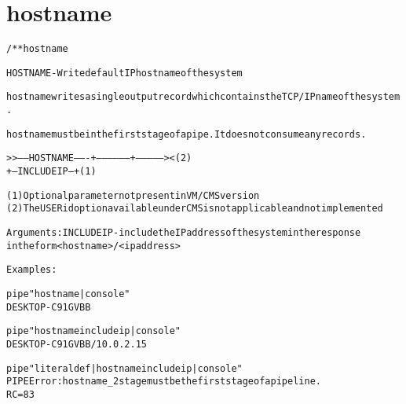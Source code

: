 \section{hostname}
\begin{shaded}
\begin{alltt}
/** hostname


     HOSTNAME - Write default IP host name of the system
   
     hostname writes a single output record which contains the TCP/IP name of the system. 
      
     hostname must be in the first stage of a pipe.  It does not consume any records.  
                                              
     >>-----HOSTNAME -------+-----------------+--------------><   (2)
                            +--- INCLUDEIP ---+ (1)
  
     (1) Optional parameter not present in VM/CMS version
     (2) The USERid option available under CMS is not applicable and not implemented
   
     Arguments:  INCLUDEIP - include the IP address of the system in the response
                             in the form <hostname>/<ip address>
   
     Examples:
   
     pipe "hostname | console"
     DESKTOP-C91GVBB
   
     pipe "hostname includeip | console"
     DESKTOP-C91GVBB/10.0.2.15
   
     pipe "literal def | hostname includeip | console"
     PIPE Error: hostname_2 stage must be the first stage of a pipeline.
     RC=83
    

\end{alltt}
\end{shaded}
